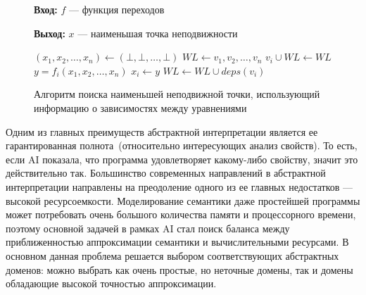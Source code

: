 \begin{figure}[h!]
\textbf{Вход:} $f$ --- функция переходов

\textbf{Выход:} $x$ --- наименьшая точка неподвижности

\begin{algorithmic}
\State $(x_1, x_2, \ldots, x_n) \gets (\bot, \bot, \ldots, \bot)$ 
\State $WL \gets {v_1, v_2, \ldots, v_n}$ 
	\State ${v_i} \cup WL \gets WL$
	\State $y = f_i(x_1, x_2, \ldots, x_n)$ 
		\State $x_i \gets y$
		\State $WL \gets WL \cup deps(v_i)$
	\EndIf 
\EndWhile
\end{algorithmic}

\caption{Алгоритм поиска наименьшей неподвижной точки, использующий 
информацию о зависимостях между уравнениями}
\label{image:worklistLFP}
\end{figure}

Одним из главных преимуществ абстрактной интерпретации является ее 
гарантированная полнота~(относительно интересующих анализ свойств). То есть,
если AI показала, что программа удовлетворяет какому-либо свойству, значит это
действительно так. Большинство современных
направлений в абстрактной интерпретации направлены на преодоление одного из ее
главных недостатков --- высокой ресурсоемкости. Моделирование семантики даже 
простейшей программы может потребовать очень большого количества памяти и 
процессорного времени, поэтому основной задачей в рамках AI стал поиск баланса 
между приближенностью аппроксимации семантики и вычислительными ресурсами.
В основном данная проблема решается выбором соответствующих абстрактных доменов:
можно выбрать как очень простые, но неточные домены, так и домены обладающие 
высокой точностью аппроксимации.

